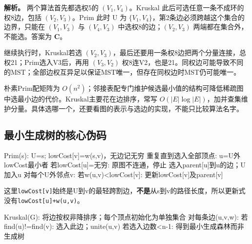 \textbf{解析。} 两个算法首先都选权5的 \((V_1,V_4)\)。Kruskal 此后可选任意一条不成环的权8边，包括 \((V_2,V_3)\)。Prim 此时 U 为 \(\{V_1,V_4\}\)，第2条边必须跨越这个集合的边界，只能在 \((V_1,V_3)\) 与 \((V_4,V_3)\) 中选权8的边；\((V_2,V_3)\) 两端都在集合外，不能选。答案为 \textbf{C}。

继续执行时，Kruskal若选 \((V_2,V_3)\)，最后还要用一条权8边把两个分量连接，总权21；Prim选入V3后，再用 \((V_3,V_2)\) 权8连V2，也是21。同权边可能导致不同的MST；全部边权互异足以保证MST唯一，但存在同权边时MST仍可能唯一。

朴素Prim配矩阵为 \(O(n^2)\)；邻接表配专门维护候选最小值的结构可降低稀疏图中选最小边的代价。Kruskal主要花在边排序，常写 \(O(|E|\log|E|)\)，加并查集维护分量。具体选哪一个，还要看图的表示与选边的实现，不能只比较算法名字。

\subsection{最小生成树的核心伪码}\label{DS06-mst-code}

\par\medskip\noindent\begin{minipage}{\linewidth}
\begin{codeblock}[language={}]
Prim(s):
    U={s}; lowCost[v]=w(s,v)，无边记无穷
    重复直到选入全部顶点:
        u=U外lowCost最小者
        若lowCost[u]=无穷: 原图不连通，停止
        选入parent[u]到u的边；U加入u
        对每个U外邻点v:
            若w(u,v)<lowCost[v]: 更新lowCost[v]及parent[v]
\end{codeblock}
\end{minipage}\par\medskip

这里\texttt{lowCost[\allowbreak{}v]\allowbreak{}}始终是U到v的最轻跨割边，\textbf{不是}从s到v的路径长度，所以更新式没有\texttt{lowCost[\allowbreak{}u]\allowbreak{}+\allowbreak{}w(\allowbreak{}u,\allowbreak{}v)\allowbreak{}}。

\par\medskip\noindent\begin{minipage}{\linewidth}
\begin{codeblock}[language={}]
Kruskal(G):
    将边按权非降排序；每个顶点初始化为单独集合
    对每条边(u,v,w):
        若find(u)!=find(v):
            选入此边；unite(u,v)
    若选入边数<n-1: 得到最小生成森林而非生成树
\end{codeblock}
\end{minipage}\par\medskip

